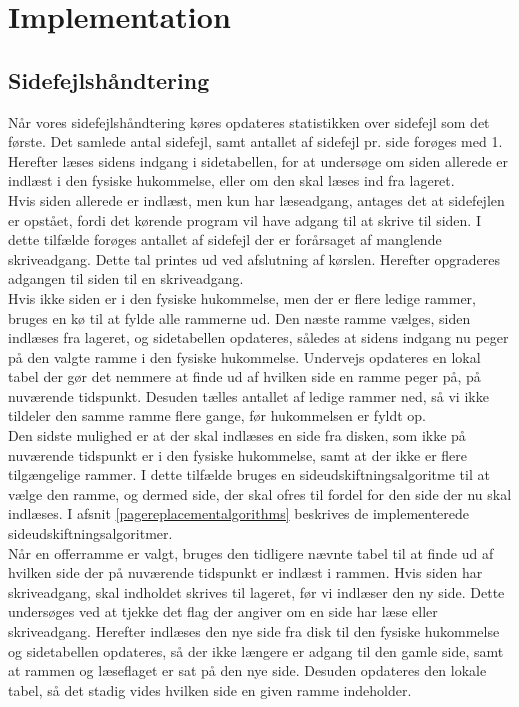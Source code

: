 \section{Implementation}
\subsection{Sidefejlshåndtering}
Når vores sidefejlshåndtering køres opdateres statistikken over sidefejl som det første. Det samlede antal sidefejl, samt antallet af sidefejl pr. side forøges med 1. Herefter læses sidens indgang i sidetabellen, for at undersøge om siden allerede er indlæst i den fysiske hukommelse, eller om den skal læses ind fra lageret.\\

Hvis siden allerede er indlæst, men kun har læseadgang, antages det at sidefejlen er opstået, fordi det kørende program vil have adgang til at skrive til siden. I dette tilfælde forøges antallet af sidefejl der er forårsaget af manglende skriveadgang. Dette tal printes ud ved afslutning af kørslen. Herefter opgraderes adgangen til siden til en skriveadgang.\\

Hvis ikke siden er i den fysiske hukommelse, men der er flere ledige rammer, bruges en kø til at fylde alle rammerne ud. Den næste ramme vælges, siden indlæses fra lageret, og sidetabellen opdateres, således at sidens indgang nu peger på den valgte ramme i den fysiske hukommelse. Undervejs opdateres en lokal tabel der gør det nemmere at finde ud af hvilken side en ramme peger på, på nuværende tidspunkt. Desuden tælles antallet af ledige rammer ned, så vi ikke tildeler den samme ramme flere gange, før hukommelsen er fyldt op.\\

Den sidste mulighed er at der skal indlæses en side fra disken, som ikke på nuværende tidspunkt er i den fysiske hukommelse, samt at der ikke er flere tilgængelige rammer. I dette tilfælde bruges en sideudskiftningsalgoritme til at vælge den ramme, og dermed side, der skal ofres til fordel for den side der nu skal indlæses. I afsnit \ref{pagereplacementalgorithms} beskrives de implementerede sideudskiftningsalgoritmer.\\

Når en offerramme er valgt, bruges den tidligere nævnte tabel til at finde ud af hvilken side der på nuværende tidspunkt er indlæst i rammen. Hvis siden har skriveadgang, skal indholdet skrives til lageret, før vi indlæser den ny side. Dette undersøges ved at tjekke det flag der angiver om en side har læse eller skriveadgang. Herefter indlæses den nye side fra disk til den fysiske hukommelse og sidetabellen opdateres, så der ikke længere er adgang til den gamle side, samt at rammen og læseflaget er sat på den nye side. Desuden opdateres den lokale tabel, så det stadig vides hvilken side en given ramme indeholder.

